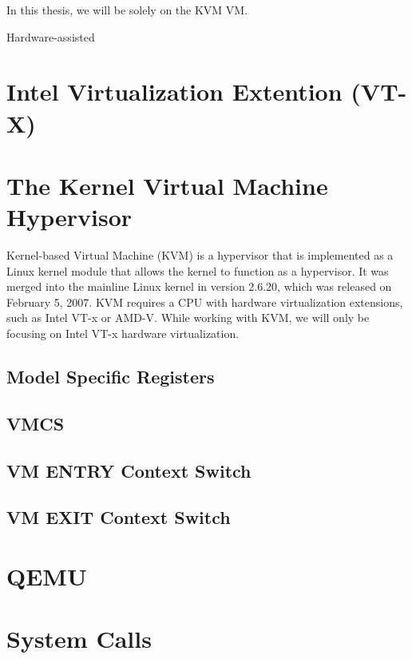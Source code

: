 \documentclass{report}
\begin{document}
\begin{spacing}{1.5}
{In this thesis, we will be solely on the KVM VM.








Hardware-assisted




}













\section{Intel Virtualization Extention (VT-X)}
\section{The Kernel Virtual Machine Hypervisor}


{\large 
Kernel-based Virtual Machine (KVM) is a hypervisor that is implemented as a Linux kernel module that allows the kernel to function as a hypervisor. It was merged into the mainline Linux kernel in version 2.6.20, which was released on February 5, 2007. KVM requires a CPU with hardware virtualization extensions, such as Intel VT-x or AMD-V. While working with KVM, we will only be focusing on Intel VT-x hardware virtualization.
\newline
}



\subsection{Model Specific Registers}
\subsection{VMCS}
\subsection{VM ENTRY Context Switch}
\subsection{VM EXIT Context Switch}
\section{QEMU}
\section{System Calls}

\end{spacing}
\end{document}
